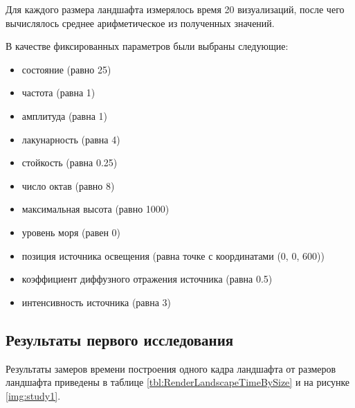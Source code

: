 Для каждого размера ландшафта измерялось время 20 визуализаций, после чего вычислялось среднее арифметическое из полученных значений.

В качестве фиксированных параметров были выбраны следующие:

\begin{itemize}[label=--]
	\item состояние (равно 25)
	\item частота (равна 1)
	\item амплитуда (равна 1)
	\item лакунарность (равна 4)
	\item стойкость (равна 0.25)
	\item число октав (равно 8)
	\item максимальная высота (равно 1000)
	\item уровень моря (равен 0)
	\item позиция источника освещения (равна точке с координатами (0, 0, 600))
	\item коэффициент диффузного отражения источника (равна 0.5)
	\item интенсивность источника (равна 3)
\end{itemize}

\subsection{Результаты первого исследования}

Результаты замеров времени построения одного кадра ландшафта от размеров ландшафта приведены в таблице \ref{tbl:RenderLandscapeTimeBySize} и на рисунке \ref{img:study1}.

\clearpage

